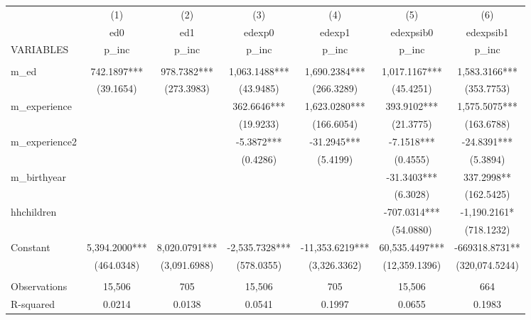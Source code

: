 \begin{tabular}{lcccccc} \hline
 & (1) & (2) & (3) & (4) & (5) & (6) \\
 & ed0 & ed1 & edexp0 & edexp1 & edexpsib0 & edexpsib1 \\
VARIABLES & p\_inc & p\_inc & p\_inc & p\_inc & p\_inc & p\_inc \\ \hline
 &  &  &  &  &  &  \\
m\_ed & 742.1897*** & 978.7382*** & 1,063.1488*** & 1,690.2384*** & 1,017.1167*** & 1,583.3166*** \\
 & (39.1654) & (273.3983) & (43.9485) & (266.3289) & (45.4251) & (353.7753) \\
m\_experience &  &  & 362.6646*** & 1,623.0280*** & 393.9102*** & 1,575.5075*** \\
 &  &  & (19.9233) & (166.6054) & (21.3775) & (163.6788) \\
m\_experience2 &  &  & -5.3872*** & -31.2945*** & -7.1518*** & -24.8391*** \\
 &  &  & (0.4286) & (5.4199) & (0.4555) & (5.3894) \\
m\_birthyear &  &  &  &  & -31.3403*** & 337.2998** \\
 &  &  &  &  & (6.3028) & (162.5425) \\
hhchildren &  &  &  &  & -707.0314*** & -1,190.2161* \\
 &  &  &  &  & (54.0880) & (718.1232) \\
Constant & 5,394.2000*** & 8,020.0791*** & -2,535.7328*** & -11,353.6219*** & 60,535.4497*** & -669318.8731** \\
 & (464.0348) & (3,091.6988) & (578.0355) & (3,326.3362) & (12,359.1396) & (320,074.5244) \\
 &  &  &  &  &  &  \\
Observations & 15,506 & 705 & 15,506 & 705 & 15,506 & 664 \\
 R-squared & 0.0214 & 0.0138 & 0.0541 & 0.1997 & 0.0655 & 0.1983 \\ \hline
\end{tabular}
